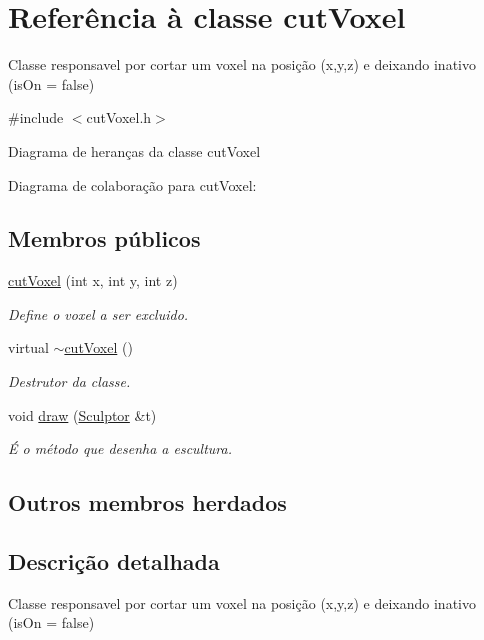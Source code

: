 \hypertarget{classcut_voxel}{}\section{Referência à classe cut\+Voxel}
\label{classcut_voxel}


Classe responsavel por cortar um voxel na posição (x,y,z) e deixando inativo (is\+On = false)  




{\ttfamily \#include $<$cut\+Voxel.\+h$>$}



Diagrama de heranças da classe cut\+Voxel


Diagrama de colaboração para cut\+Voxel\+:
\subsection*{Membros públicos}
\begin{DoxyCompactItemize}
\item 
\hyperlink{classcut_voxel_a43e26aed4629e0a53d76fc89a849febd}{cut\+Voxel} (int x, int y, int z)
\begin{DoxyCompactList}\small\item\em Define o voxel a ser excluido. \end{DoxyCompactList}\item 
\mbox{\label{classcut_voxel_aa70df4b1dbf05f9b90ac24fd9323403b}} 
virtual \hyperlink{classcut_voxel_aa70df4b1dbf05f9b90ac24fd9323403b}{$\sim$cut\+Voxel} ()
\begin{DoxyCompactList}\small\item\em Destrutor da classe. \end{DoxyCompactList}\item 
void \hyperlink{classcut_voxel_aaabe3257d363e6f8abff1dc5f2632550}{draw} (\hyperlink{class_sculptor}{Sculptor} \&t)
\begin{DoxyCompactList}\small\item\em É o método que desenha a escultura. \end{DoxyCompactList}\end{DoxyCompactItemize}
\subsection*{Outros membros herdados}


\subsection{Descrição detalhada}
Classe responsavel por cortar um voxel na posição (x,y,z) e deixando inativo (is\+On = false) 


